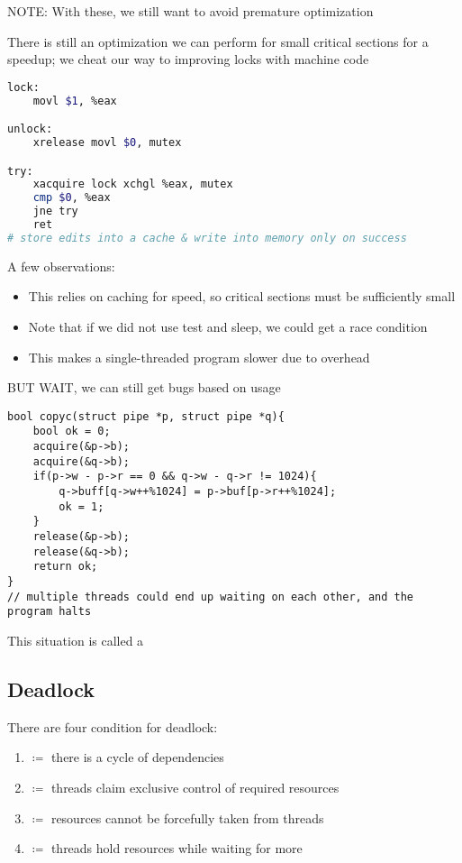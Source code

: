 \documentclass[../../lecture_notes.tex]{subfiles}
\begin{document}
NOTE: With these, we still want to avoid premature optimization

There is still an optimization we can perform for small critical sections for a speedup; we  cheat our way to improving locks with machine code
\begin{lstlisting}[language=sh]
lock:
	movl $1, %eax

unlock:
	xrelease movl $0, mutex

try:
	xacquire lock xchgl %eax, mutex
	cmp $0, %eax
	jne try
	ret
# store edits into a cache & write into memory only on success
\end{lstlisting}
A few observations:
\begin{itemize}
	\item This relies on caching for speed, so critical sections must be sufficiently small
	\item Note that if we did not use test and sleep, we could get a race condition
	\item This makes a single-threaded program slower due to overhead
\end{itemize}

BUT WAIT, we can still get bugs based on usage
\begin{lstlisting}
bool copyc(struct pipe *p, struct pipe *q){
	bool ok = 0;
	acquire(&p->b);
	acquire(&q->b);
	if(p->w - p->r == 0 && q->w - q->r != 1024){
		q->buff[q->w++%1024] = p->buf[p->r++%1024];
		ok = 1;
	}
	release(&p->b);
	release(&q->b);
	return ok;
}
// multiple threads could end up waiting on each other, and the program halts
\end{lstlisting}

This situation is called a

\subsection{Deadlock}

There are four condition for deadlock:
\begin{enumerate}
	\item {} $\coloneqq$ there is a cycle of dependencies
	\item {} $\coloneqq$ threads claim exclusive control of required resources
	\item {} $\coloneqq$ resources cannot be forcefully taken from threads
	\item {} $\coloneqq$ threads hold resources while waiting for more
\end{enumerate}
\end{document}
